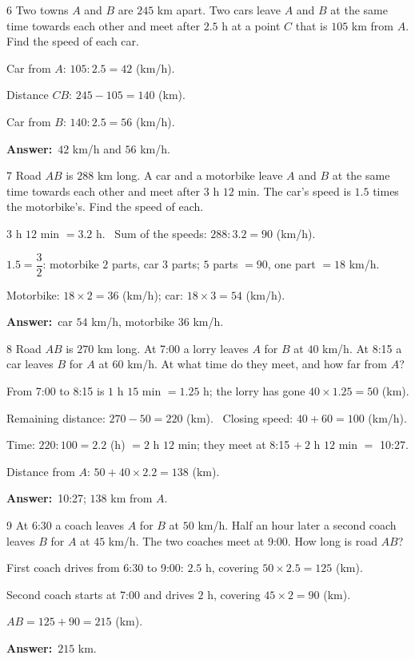 \documentclass[11pt]{article}
\newif\ifsol \solfalse
\providecommand{\AnsWord}{Đáp số}
\newcommand{\dapso}[1]{\par\textbf{\AnsWord:}\ #1}
\newcommand{\probsol}[1]{%
  \begin{lrbox}{\solmeasure}\begin{minipage}{\dimexpr\linewidth-24pt\relax}#1\end{minipage}\end{lrbox}%
  \ifsol
    \begin{solbox}#1\end{solbox}%
  \else
    \setlength{\solht}{\dimexpr\ht\solmeasure+\dp\solmeasure+0.85cm\relax}%
    \ifdim\solht<1.35cm\setlength{\solht}{1.35cm}\fi
    \begin{tcolorbox}[colback=white,colframe=Line,boxrule=0.8pt,arc=5pt,
      left=8pt,right=8pt,top=4pt,bottom=4pt,height=\solht]{\footnotesize\color{Slate}\itshape\WorkWord}\end{tcolorbox}%
  \fi}
\newcommand{\gap}{\vspace{0.3cm}}
\def\WorkWord{Your work:}
\def\AnsWord{Answer}
\begin{document}
\gap
\begin{probbox}{6}{\relax}
Two towns $A$ and $B$ are $245$ km apart. Two cars leave $A$ and $B$ at the same time towards each other and meet after $2.5$ h at a point $C$ that is $105$ km from $A$. Find the speed of each car.
\end{probbox}
\probsol{
Car from $A$: $105:2.5=42$ (km/h).\par Distance $CB$: $245-105=140$ (km).\par Car from $B$: $140:2.5=56$ (km/h).
\dapso{$42$ km/h and $56$ km/h.}}
\gap
\begin{probbox}{7}{\relax}
Road $AB$ is $288$ km long. A car and a motorbike leave $A$ and $B$ at the same time towards each other and meet after $3$ h $12$ min. The car's speed is $1.5$ times the motorbike's. Find the speed of each.
\end{probbox}
\probsol{
$3$ h $12$ min $=3.2$ h. \ Sum of the speeds: $288:3.2=90$ (km/h).\par
$1.5=\dfrac32$: motorbike $2$ parts, car $3$ parts; $5$ parts $=90$, one part $=18$ km/h.\par
Motorbike: $18\times2=36$ (km/h); car: $18\times3=54$ (km/h).
\dapso{car $54$ km/h, motorbike $36$ km/h.}}
\gap
\begin{probbox}{8}{\relax}
Road $AB$ is $270$ km long. At 7:00 a lorry leaves $A$ for $B$ at $40$ km/h. At 8:15 a car leaves $B$ for $A$ at $60$ km/h. At what time do they meet, and how far from $A$?
\end{probbox}
\probsol{
From 7:00 to 8:15 is $1$ h $15$ min $=1.25$ h; the lorry has gone $40\times1.25=50$ (km).\par
Remaining distance: $270-50=220$ (km). \ Closing speed: $40+60=100$ (km/h).\par
Time: $220:100=2.2$ (h) $=2$ h $12$ min; they meet at 8:15 $+\ 2$ h $12$ min $=$ 10:27.\par
Distance from $A$: $50+40\times2.2=138$ (km).
\dapso{10:27; $138$ km from $A$.}}
\gap
\begin{probbox}{9}{\relax}
At 6:30 a coach leaves $A$ for $B$ at $50$ km/h. Half an hour later a second coach leaves $B$ for $A$ at $45$ km/h. The two coaches meet at 9:00. How long is road $AB$?
\end{probbox}
\probsol{
First coach drives from 6:30 to 9:00: $2.5$ h, covering $50\times2.5=125$ (km).\par
Second coach starts at 7:00 and drives $2$ h, covering $45\times2=90$ (km).\par
$AB=125+90=215$ (km).
\dapso{$215$ km.}}
\end{document}
